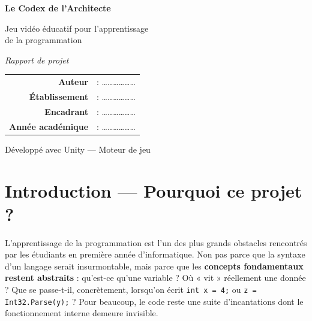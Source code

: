 \documentclass[12pt,a4paper]{article}
\begin{document}
\begin{titlepage}
  \centering
  \vspace*{2cm}
  {\Huge\bfseries Le Codex de l'Architecte\par}
  \vspace{0.6cm}
  {\Large Jeu vidéo éducatif pour l'apprentissage\\[2mm]de la programmation\par}
  \vspace{2cm}
  {\large\itshape Rapport de projet\par}
  \vspace{3cm}
  \begin{tabular}{rl}
    \textbf{Auteur} & : \dots\dots\dots\dots\dots\dots \\[3mm]
    \textbf{Établissement} & : \dots\dots\dots\dots\dots\dots \\[3mm]
    \textbf{Encadrant} & : \dots\dots\dots\dots\dots\dots \\[3mm]
    \textbf{Année académique} & : \dots\dots\dots\dots\dots\dots \\
  \end{tabular}
  \vfill
  {\large Développé avec Unity — Moteur de jeu\par}
\end{titlepage}

\tableofcontents
\thispagestyle{empty}
\clearpage

\section{Introduction — Pourquoi ce projet ?}

L'apprentissage de la programmation est l'un des plus grands obstacles rencontrés
par les étudiants en première année d'informatique. Non pas parce que la syntaxe
d'un langage serait insurmontable, mais parce que les \textbf{concepts
fondamentaux restent abstraits} : qu'est-ce qu'une variable ? Où « vit »
réellement une donnée ? Que se passe-t-il, concrètement, lorsqu'on écrit
\texttt{int x = 4;} ou \texttt{z = Int32.Parse(y);} ? Pour beaucoup, le code
reste une suite d'incantations dont le fonctionnement interne demeure invisible.
\end{document}
